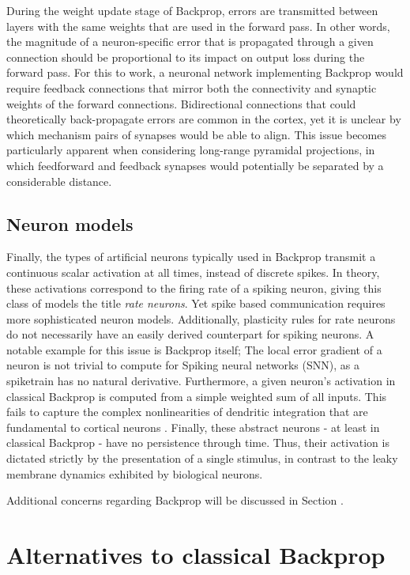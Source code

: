 During the weight update stage of Backprop, errors are transmitted between layers with the same weights that are used in
the forward pass. In other words, the magnitude of a neuron-specific error that is propagated through a given connection
should be proportional to its impact on output loss during the forward pass. For this to work, a neuronal network
implementing Backprop would require feedback connections that mirror both the connectivity and synaptic weights of the
forward connections. Bidirectional connections that could theoretically back-propagate errors are common in the cortex,
yet it is unclear by which mechanism pairs of synapses would be able to align. This issue becomes particularly apparent
when considering long-range pyramidal projections, in which feedforward and feedback synapses would potentially be
separated by a considerable distance.

\subsection{Neuron models}

Finally, the types of artificial neurons typically used in Backprop transmit a continuous scalar activation at all
times, instead of discrete spikes. In theory, these activations correspond to the firing rate of a spiking neuron,
giving this class of models the title \textit{rate neurons}. Yet spike based communication requires more sophisticated
neuron models. Additionally, plasticity rules for rate neurons do not necessarily have an easily derived counterpart for
spiking neurons. A notable example for this issue is Backprop itself; The local error gradient of a neuron is not
trivial to compute for Spiking neural networks (SNN), as a spiketrain has no natural derivative. Furthermore, a given
neuron's activation in classical Backprop is computed from a simple weighted sum of all inputs. This fails to capture
the complex nonlinearities of dendritic integration that are fundamental to cortical neurons
\citep{Gerstner2009,sjostrom2008dendritic,Eyal2018}. Finally, these abstract neurons - at least in classical Backprop -
have no persistence through time. Thus, their activation is dictated strictly by the presentation of a single stimulus,
in contrast to the leaky membrane dynamics exhibited by biological neurons.\newline

Additional concerns regarding Backprop will be discussed in Section \todo{}.


\section{Alternatives to classical Backprop}

